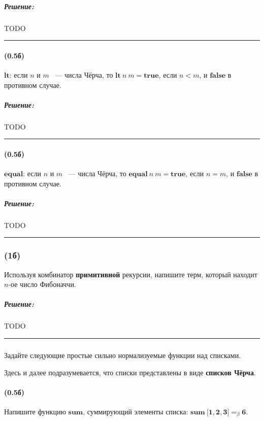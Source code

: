 \documentclass{article}
\newenvironment{proof}{\subparagraph{\hspace{-1em}Решение:\newline}}{\par\noindent\rule{\textwidth}{0.4pt}}
\newcommand{\term}[1]{\mathbf{#1}}
\newcommand{\ap}{~}
\newcommand{\eqbeta}{=_\beta}
\newcommand{\tlist}[1]{\term{[}#1\term{]}} %
\begin{document}
    \begin{proof}
        TODO %
    \end{proof}

    \paragraph{(0.5б)}

    $\term{lt}$: если $n$ и $m$ ~--- числа Чёрча, то $\term{lt}~n~m = \term{true}$, если $n < m$, и $\term{false}$ в противном случае.

    \begin{proof}
        TODO %
    \end{proof}

    \paragraph{(0.5б)}

    $\term{equal}$: если $n$ и $m$ ~--- числа Чёрча, то $\term{equal}~n~m = \term{true}$, если $n = m$, и $\term{false}$ в противном случае.

    \begin{proof}
        TODO %
    \end{proof}

    \subsubsection{(1б)}

    Используя комбинатор \textbf{примитивной} рекурсии, напишите терм, который
    находит $n$-ое число Фибоначчи.

    \begin{proof}
        TODO %
    \end{proof}

    \subsubsection{}

    Задайте следующие простые сильно нормализуемые функции над списками.

    Здесь и далее подразумевается, что списки представлены в виде \textbf{списков Чёрча}.

    \paragraph{(0.5б)}

    Напишите функцию $\term{sum}$, суммирующий элементы списка: $\term{sum} \ap \tlist{\term{1}, \term{2}, \term{3}} \eqbeta \term{6}$.
\end{document}
